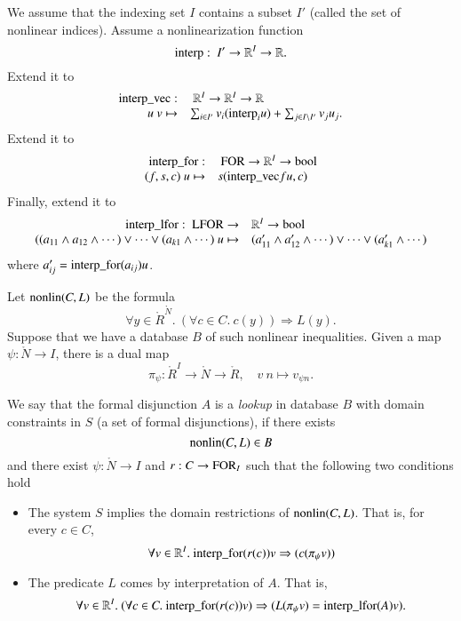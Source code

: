 We assume that the indexing set $I$ contains a subset $I'$ (called
the set of nonlinear indices). Assume a nonlinearization function
    $$
    {\operatorname{interp}}:\ I' \to \mathbb{R}^{I} \to \mathbb{R}.
    $$
Extend it to
    $$
    \begin{array}{rll}
    {\operatorname{interp\_vec}}:&\ \mathbb{R}^{I} \to \mathbb{R}^I \to
    \mathbb{R}\\
    u\ v \mapsto& \sum_{i\in I'} v_i ({\operatorname{interp}}_i u) +
        \sum_{j\in I\setminus I'} v_j u_j.
    \end{array}
    $$
Extend it to
    $$
    \begin{array}{rll}
    {\operatorname{interp\_for}}:&\ {\operatorname{FOR}}\to\mathbb{R}^I\to\operatorname{bool}\\
    (f,s,c)\ u\mapsto& s({\operatorname{interp\_vec}} f u,c)\\
    \end{array}
    $$
Finally, extend it to
    $$
    \begin{array}{rll}
    {\operatorname{interp\_lfor}}:\ {\operatorname{LFOR}}\to&\mathbb{R}^I\to\operatorname{bool}\\
    ((a_{11}\wedge a_{12}\wedge\cdots) \vee \cdots \vee (a_{k1}\wedge
    \cdots)\ u\mapsto& (a'_{11}\wedge a'_{12}\wedge\cdots) \vee \cdots \vee (a'_{k1}\wedge
    \cdots)\\
    \end{array}
    $$
where $a'_{ij} = {\operatorname{interp\_for}} (a_{ij}) u$.


Let ${\operatorname{nonlin}}(C,L)$ be the formula
    $$
    \forall y\in\ring{R}^\ring{N}.\ (\forall c\in C.\
    c(y)) \Rightarrow L(y).
    $$
Suppose that we have a database $B$ of such nonlinear
inequalities.  Given a map $\psi:\ring{N}\to I$, there is a dual
map
    $$
    \pi_\psi: \ring{R}^I \to \ring{N}\to \ring{R},\quad v\ n\mapsto
    v_{\psi n}.
    $$


\begin{definition}
    We say that the formal disjunction $A$ is a {\it lookup} in
    database $B$ with domain constraints in $S$ (a set of formal disjunctions),
    if there exists
        $$
        {\operatorname{nonlin}}(C,L)\in B
        $$
    and there exist $\psi:\ring{N}\to I$ and
    $r:C\to{\operatorname{FOR}}_I$
    such that the following two conditions hold
    \begin{itemize}
    \item The system $S$ implies the domain restrictions of
    ${\operatorname{nonlin}}(C,L)$.  That is, for every $c \in C$,
        $$
        \forall v\in\mathbb{R}^I.\ {\operatorname{interp\_for}} (r(c)) v
        \Rightarrow (c(\pi_\psi v))
        $$
    \item The predicate $L$ comes by interpretation of $A$.  That
    is,
        $$
        \forall v\in \mathbb{R}^I.\ (\forall c\in C.\ {\operatorname{interp\_for}}(r(c)) v)
        \Rightarrow (L(\pi_\psi v) =
        {\operatorname{interp\_lfor}}(A) v).
        $$
    \end{itemize}
\end{definition}


